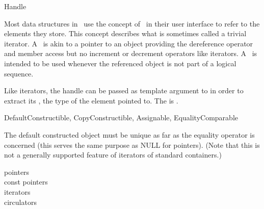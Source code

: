 
\begin{ccRefConcept}{Handle}


\ccDefinition
  
Most data structures in \cgal\ use the concept of \ccRefName\ in their user
interface to refer to the elements they store.  This concept describes what is
sometimes called a trivial iterator.  A \ccRefName\ is akin to a pointer to
an object providing the dereference operator  and member
access  but no increment or decrement operators like
iterators.  A \ccRefName\ is intended to be used whenever the referenced
object is not part of a logical sequence.
 
Like iterators, the handle can be passed as template argument to
 in order to extract its ,
the type of the element pointed to.
The  is .

\ccRefines DefaultConstructible, CopyConstructible, Assignable, EqualityComparable

The default constructed object must be unique as far as the equality
operator is concerned (this serves the same purpose as NULL for pointers).
(Note that this is not a generally supported feature of iterators of
standard containers.)

\ccCreation
{}  %


\ccGlue
{}

\ccHasModels
pointers\\
const pointers\\
iterators\\
circulators

\end{ccRefConcept}
